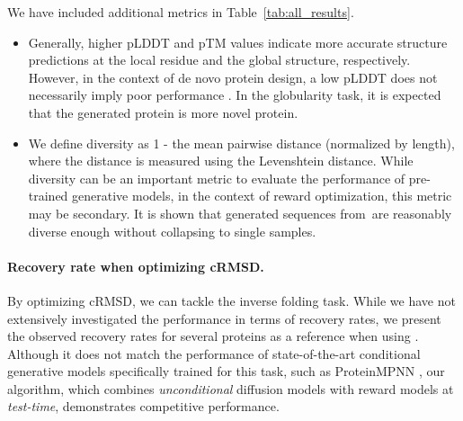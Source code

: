 We have included additional metrics in Table~\ref{tab:all_results}.
\begin{itemize}
    \item Generally, higher pLDDT and pTM values indicate more accurate structure predictions at the local residue and the global structure, respectively. However, in the context of de novo protein design, a low pLDDT does not necessarily imply poor performance \citep{verkuil2022language}. In the globularity task, it is expected that the generated protein is more novel protein.  
    \item We define diversity as 1 - the mean pairwise distance (normalized by length), where the distance is measured using the Levenshtein distance. While diversity can be an important metric to evaluate the performance of pre-trained generative models, in the context of reward optimization, this metric may be secondary. It is shown that generated sequences from \alg\,are reasonably diverse enough without collapsing to single samples. 
\end{itemize}

\begin{table*}[!h]
    \centering
    \caption{Additional metrics for experiments in protein design. We have reported the median of pLDDT, pTM, and diversity of generated proteins.  } 
    \label{tab:all_results}
\end{table*}


\paragraph{Recovery rate when optimizing cRMSD.}

By optimizing cRMSD, we can tackle the inverse folding task. While we have not extensively investigated the performance in terms of recovery rates, we present the observed recovery rates for several proteins as a reference when using \alg. Although it does not match the performance of state-of-the-art conditional generative models specifically trained for this task, such as ProteinMPNN \citep{dauparas2022robust}, our algorithm, which combines \emph{unconditional} diffusion models with reward models at \emph{test-time}, demonstrates competitive performance.



